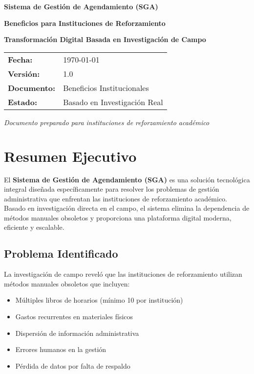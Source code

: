 \documentclass[12pt,a4paper]{article}
\begin{document}
\begin{titlepage}
    \centering
    \vspace*{2cm}
    
    {\Huge\bfseries\color{blue} Sistema de Gestión de Agendamiento (SGA)}
    
    \vspace{1cm}
    
    {\Large\textbf{Beneficios para Instituciones de Reforzamiento}}
    
    \vspace{2cm}
    
    {\large\textbf{Transformación Digital Basada en Investigación de Campo}}
    
    \vspace{3cm}
    
    \begin{tabular}{ll}
        \textbf{Fecha:} & \today \\
        \textbf{Versión:} & 1.0 \\
        \textbf{Documento:} & Beneficios Institucionales \\
        \textbf{Estado:} & Basado en Investigación Real \\
    \end{tabular}
    
    \vfill
    
    {\large\textit{Documento preparado para instituciones de reforzamiento académico}}
    
\end{titlepage}

\tableofcontents
\newpage

\section{Resumen Ejecutivo}

El \textbf{Sistema de Gestión de Agendamiento (SGA)} es una solución tecnológica integral diseñada específicamente para resolver los problemas de gestión administrativa que enfrentan las instituciones de reforzamiento académico. Basado en investigación directa en el campo, el sistema elimina la dependencia de métodos manuales obsoletos y proporciona una plataforma digital moderna, eficiente y escalable.

\subsection{Problema Identificado}
La investigación de campo reveló que las instituciones de reforzamiento utilizan métodos manuales obsoletos que incluyen:
\begin{itemize}
    \item Múltiples libros de horarios (mínimo 10 por institución)
    \item Gastos recurrentes en materiales físicos
    \item Dispersión de información administrativa
    \item Errores humanos en la gestión
    \item Pérdida de datos por falta de respaldo
\end{itemize}
\end{document}
